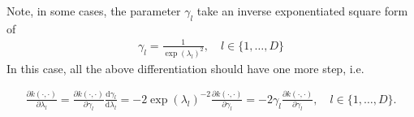 \documentclass[10pt,oneside,a4paper,notitlepage]{article}
\begin{document}
Note, in some cases, the parameter $\gamma_l$ take an inverse exponentiated square form of
\begin{align}
\gamma_l = \frac{1}{\exp(\lambda_l)^2}, \quad l\in\{1,\ldots,D\}
\end{align}
In this case, all the above differentiation should have one more step, i.e.

\begin{align}
\frac{\partial k(\cdot, \cdot) }{\partial\lambda_l} =  \frac{\partial k(\cdot, \cdot)}{\partial\gamma_l}\frac{\mathrm{d}\gamma_l}{\mathrm{d}\lambda_l} =  -2\exp(\lambda_{l})^{-2}\frac{\partial k(\cdot, \cdot)}{\partial\gamma_l} = -2\gamma_{l}\frac{\partial k(\cdot, \cdot)}{\partial\gamma_l} , \quad l\in\{1,\ldots,D\}.
\end{align}



\end{document}
